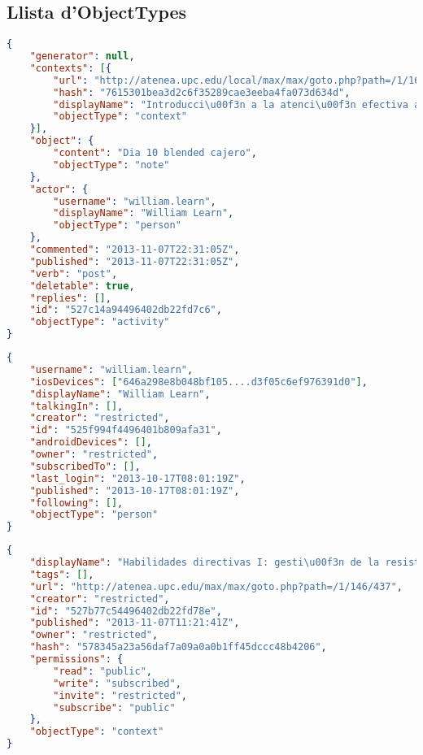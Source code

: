 \subsection{Llista d'ObjectTypes}



\begin{lstlisting}[caption=ObjectType activity, label=objectType_activity, language=json]
{
    "generator": null,
    "contexts": [{
        "url": "http://atenea.upc.edu/local/max/max/goto.php?path=/1/167/424",
        "hash": "7615301bea3d2c6f35289cae3eeba4fa073d634d",
        "displayName": "Introducci\u00f3n a la atenci\u00f3n efectiva al cliente",
        "objectType": "context"
    }],
    "object": {
        "content": "Dia 10 blended cajero",
        "objectType": "note"
    },
    "actor": {
        "username": "william.learn",
        "displayName": "William Learn",
        "objectType": "person"
    },
    "commented": "2013-11-07T22:31:05Z",
    "published": "2013-11-07T22:31:05Z",
    "verb": "post",
    "deletable": true,
    "replies": [],
    "id": "527c14a94496402db22fd7c6",
    "objectType": "activity"
}
\end{lstlisting}

\begin{lstlisting}[caption=ObjectType person, label=objectType_person, language=json]
{
    "username": "william.learn",
    "iosDevices": ["646a298e8b048bf105....d3f05c6ef976391d0"],
    "displayName": "William Learn",
    "talkingIn": [],
    "creator": "restricted",
    "id": "525f994f4496401b809afa31",
    "androidDevices": [],
    "owner": "restricted",
    "subscribedTo": [],
    "last_login": "2013-10-17T08:01:19Z",
    "published": "2013-10-17T08:01:19Z",
    "following": [],
    "objectType": "person"
}
\end{lstlisting}

\begin{lstlisting}[caption=ObjectType context, label=objectType_context, language=json]
{
    "displayName": "Habilidades directivas I: gesti\u00f3n de la resistencia y la planificaci\u00f3n",
    "tags": [],
    "url": "http://atenea.upc.edu/max/max/goto.php?path=/1/146/437",
    "creator": "restricted",
    "id": "527b77c54496402db22fd78e",
    "published": "2013-11-07T11:21:41Z",
    "owner": "restricted",
    "hash": "578345a23a56daf7a09a0a0b1ff45dccc48b4206",
    "permissions": {
        "read": "public",
        "write": "subscribed",
        "invite": "restricted",
        "subscribe": "public"
    },
    "objectType": "context"
}
\end{lstlisting}

